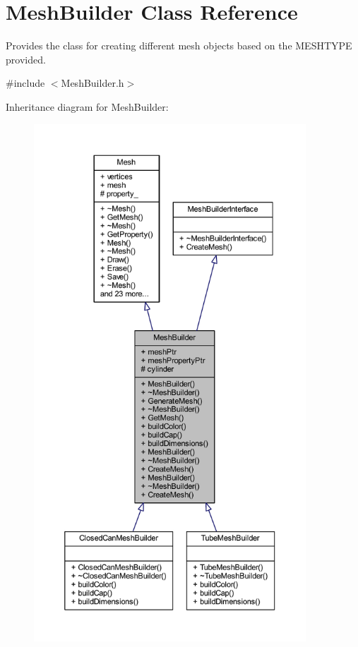 \hypertarget{class_mesh_builder}{}\section{Mesh\+Builder Class Reference}
\label{class_mesh_builder}


Provides the class for creating different mesh objects based on the M\+E\+S\+H\+T\+Y\+PE provided.  




{\ttfamily \#include $<$Mesh\+Builder.\+h$>$}



Inheritance diagram for Mesh\+Builder\+:
\nopagebreak
\begin{figure}[H]
\begin{center}
\leavevmode
\includegraphics[height=550pt]{class_mesh_builder__inherit__graph}
\end{center}
\end{figure}


